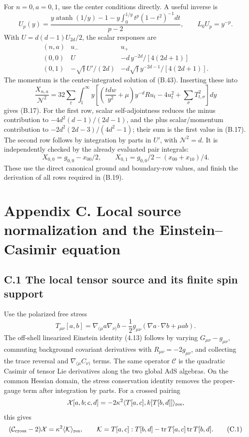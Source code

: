 \documentclass[a4paper,11pt]{article}
\numberwithin{equation}{section}
\begin{document}
For \(n=0,a=0,1\), use the center conditions directly. A useful inverse is \[
U_p(y)=\frac{y\operatorname{atanh}(1/y)-1
-y\int_0^{1/y}t^p(1-t^2)^{-1}dt}{p-2},
\qquad L_0U_p=y^{-p}.
\] With \(U=d(d-1)U_{2d}/2\), the scalar responses are \[
\begin{array}{c|cc}
(n,a)&u_-&u_+\\ \hline
(0,0)&U&-d\,y^{-2d}/[4(2d+1)]\\
(0,1)&-\sqrt{\mathfrak f}\,U'/(2d)&
-d\sqrt{\mathfrak f}\,y^{-2d-1}/[4(2d+1)] .
\end{array}
\tag{B.57}
\] The momentum is the center-integrated solution of (B.43). Inserting these into \[
\frac{X_{n,a}}{\mathcal N^2}
=32\sum_t\int_1^\infty y
\left[
\left(\frac{tdw}{y^2}+\mu\right)y^{-d}Ru_t
-4u_t^2+\sum_\sigma T_{t,\sigma}^2
\right]dy
\] gives (B.17). For the first row, scalar self-adjointness reduces the minus contribution to \(-4d^2(d-1)/(2d-1)\), and the plus scalar/momentum contribution to \(-2d^2(2d-3)/(4d^2-1)\); their sum is the first value in (B.17). The second row follows by integration by parts in \(U'\), with \(\mathcal N^2=d\). It is independently checked by the already evaluated pair integrals: \[
X_{0,0}=g_{0,0}-x_{00}/2,\qquad
X_{0,1}=g_{0,0}/2-(x_{00}+x_{10})/4 .
\] These use the direct canonical ground and boundary-row values, and finish the derivation of all rows required in (B.19).

\clearpage
\hypertarget{appendix-c.-local-source-normalization-and-the-einsteincasimir-equation}{%
\section{Appendix C. Local source normalization and the Einstein--Casimir equation}\label{appendix-c.-local-source-normalization-and-the-einsteincasimir-equation}}

\hypertarget{c.1-the-local-tensor-source-and-its-finite-spin-support}{%
\subsection{C.1 The local tensor source and its finite spin support}\label{c.1-the-local-tensor-source-and-its-finite-spin-support}}

Use the polarized free stress \[
T_{\mu\nu}[a,b]
=\nabla_{(\mu}a\nabla_{\nu)}b
-\frac12g_{\mu\nu}(\nabla a\cdot\nabla b+\mu ab).
\] The off-shell linearized Einstein identity (4.13) follows by varying \(G_{\mu\nu}-g_{\mu\nu}\), commuting background covariant derivatives with \(R_{\mu\nu}=-2g_{\mu\nu}\), and collecting the trace reversal and \(\nabla_{(\mu}C_{\nu)}\) terms. The same operator \(\mathcal C\) is the quadratic Casimir of tensor Lie derivatives along the two global AdS algebras. On the common Hessian domain, the stress conservation identity removes the proper-gauge term after integration by parts. For a crossed pairing \[
\mathcal X[a,b;c,d]
=-2\kappa^2\langle T[a,c],k[T[b,d]]\rangle_{\rm res},
\] this gives \[
(\mathcal C_{\rm cross}-2)\mathcal X
=\kappa^2\langle\mathcal K\rangle_{\rm res},\qquad
\mathcal K=T[a,c]:T[b,d]
-\operatorname{tr}T[a,c]\operatorname{tr}T[b,d].
\tag{C.1}
\]
\end{document}
